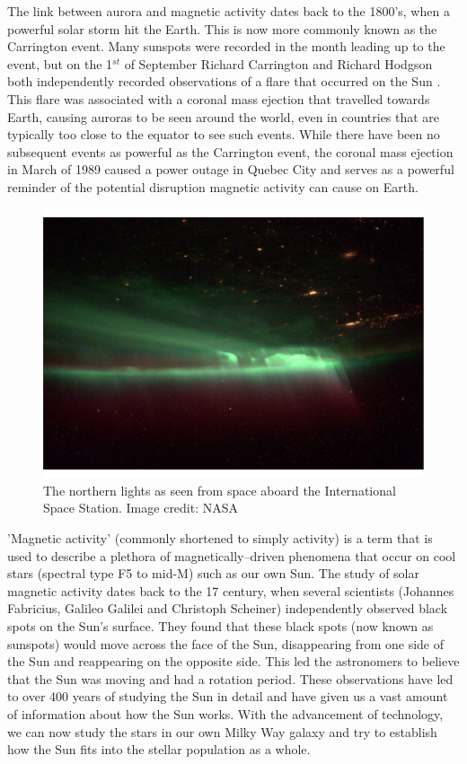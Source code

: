 The link between aurora and magnetic activity dates back to the 1800's, when a powerful solar storm hit the Earth. This is now more commonly known as the Carrington event. Many sunspots were recorded in the month leading up to the event, but on the 1$^{st}$ of September Richard Carrington and Richard Hodgson both independently recorded observations of a flare that occurred on the Sun \citep{Carrington_1858,Hodgson_1859}. This flare was associated with a coronal mass ejection that travelled towards Earth, causing auroras to be seen around the world, even in countries that are typically too close to the equator to see such events. While there have been no subsequent events as powerful as the Carrington event, the coronal mass ejection in March of 1989 caused a power outage in Quebec City and serves as a powerful reminder of the potential disruption magnetic activity can cause on Earth. 

\begin{figure}
    \centering
    \includegraphics[scale=0.4]{Figures/1-Introduction/northern_lights_iss_20131009.pdf}
    \caption[Image of the northern lights as seen from space]{The northern lights as seen from space aboard the International Space Station. Image credit: NASA}
    \label{fig:aurora_from_space}
\end{figure}

'Magnetic activity' (commonly shortened to simply activity) is a term that is used to describe a plethora of magnetically--driven phenomena that occur on cool stars (spectral type F5 to mid-M) such as our own Sun. The study of solar magnetic activity dates back to the 17 century, when several scientists (Johannes Fabricius, Galileo Galilei and Christoph Scheiner) independently observed black spots on the Sun's surface. They found that these black spots (now known as sunspots) would move across the face of the Sun, disappearing from one side of the Sun and reappearing on the opposite side. This led the astronomers to believe that the Sun was moving and had a rotation period. These observations have led to over 400 years of studying the Sun in detail and have given us a vast amount of information about how the Sun works. With the advancement of technology, we can now study the stars in our own Milky Way galaxy and try to establish how the Sun fits into the stellar population as a whole.

